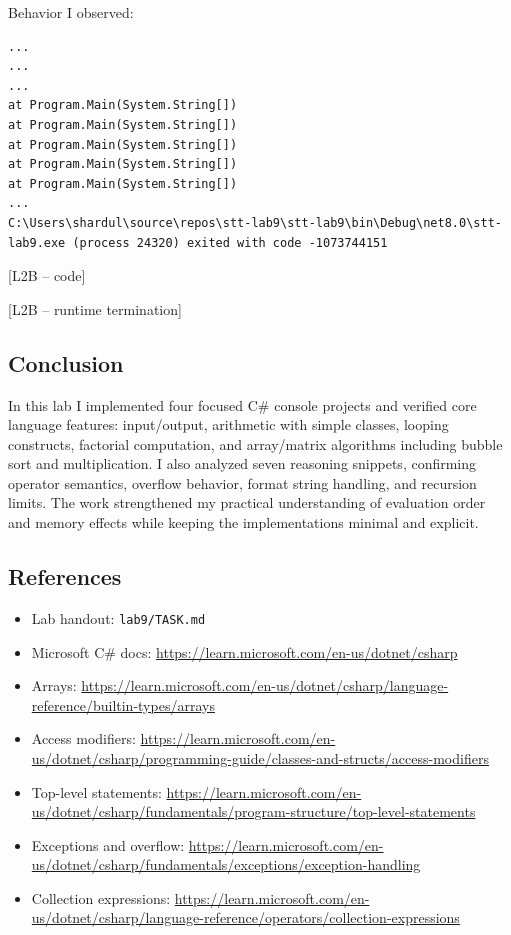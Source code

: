 Behavior I observed:
\begin{verbatim}
...
...
...
at Program.Main(System.String[])
at Program.Main(System.String[])
at Program.Main(System.String[])
at Program.Main(System.String[])
at Program.Main(System.String[])
...
C:\Users\shardul\source\repos\stt-lab9\stt-lab9\bin\Debug\net8.0\stt-lab9.exe (process 24320) exited with code -1073744151
\end{verbatim}

[L2B -- code]

[L2B -- runtime termination]

\subsection{Conclusion}
In this lab I implemented four focused C\# console projects and verified core language features: input/output, arithmetic with simple classes, looping constructs, factorial computation, and array/matrix algorithms including bubble sort and multiplication. I also analyzed seven reasoning snippets, confirming operator semantics, overflow behavior, format string handling, and recursion limits. The work strengthened my practical understanding of evaluation order and memory effects while keeping the implementations minimal and explicit.

\subsection{References}
\begin{itemize}[itemsep=0pt]
	\item Lab handout: \texttt{lab9/TASK.md}
	\item Microsoft C\# docs: \url{https://learn.microsoft.com/en-us/dotnet/csharp}
	\item Arrays: \url{https://learn.microsoft.com/en-us/dotnet/csharp/language-reference/builtin-types/arrays}
	\item Access modifiers: \url{https://learn.microsoft.com/en-us/dotnet/csharp/programming-guide/classes-and-structs/access-modifiers}
	\item Top-level statements: \url{https://learn.microsoft.com/en-us/dotnet/csharp/fundamentals/program-structure/top-level-statements}
	\item Exceptions and overflow: \url{https://learn.microsoft.com/en-us/dotnet/csharp/fundamentals/exceptions/exception-handling}
	\item Collection expressions: \url{https://learn.microsoft.com/en-us/dotnet/csharp/language-reference/operators/collection-expressions}
\end{itemize}

